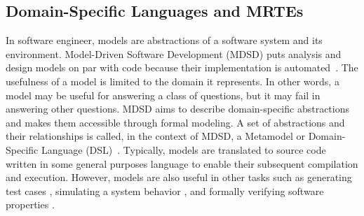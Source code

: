 \subsection{Domain-Specific Languages and MRTEs} \label{sec:DSL-on-MRTEs}

In software engineer, models are abstractions of a software system and its environment.
Model-Driven Software Development (MDSD) puts analysis and design models on par with
code because their implementation is automated~\cite{Stahl:2006:MSD:1196766, Fowler:2010:DSL:1809745}.
The usefulness of a model is limited to the domain it represents.
In other words, a model may be useful for answering a class of questions, but it may fail in answering other questions.
MDSD aims to describe domain-specific abstractions and makes them accessible through formal modeling.
A set of abstractions and their relationships is called, in the context of MDSD, a Metamodel or Domain-Specific Language (DSL)~\cite{Fowler:2010:DSL:1809745}.
Typically, models are translated to source code written in some general purposes language to enable their subsequent compilation and execution.
However, models are also useful in other tasks such as generating test cases \cite{Kiffe2009,Gutierrez2015}, simulating a system behavior \cite{Broenink2012,brosig2015a,Bocciarelli2015425}, and formally verifying software properties \cite{Holzmann2004,Henriksson2005101,Moffett2013,DiGuglielmo20132013}. 

